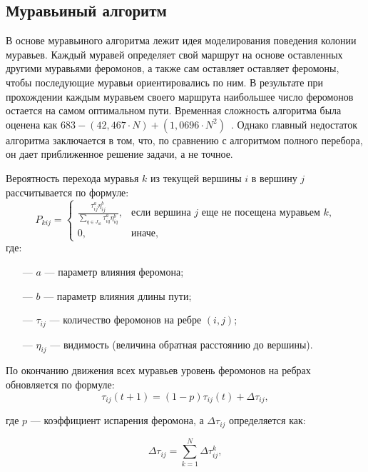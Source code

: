 \subsection{Муравьиный алгоритм}
В основе муравьиного алгоритма лежит идея моделирования поведения колонии муравьев. Каждый муравей определяет свой маршрут на основе оставленных другими муравьями феромонов, а также сам оставляет оставляет феромоны, чтобы последующие муравьи ориентировались по ним. В результате при прохождении каждым муравьем своего маршрута наибольшее число феромонов остается на самом оптимальном пути. Временная сложность алгоритма была оценена как $683 - (42,467 · N) + (1,0696 · N^2)$~\cite{ants}. Однако главный недостаток алгоритма заключается в том, что, по сравнению с алгоритмом полного перебора, он дает приближенное решение задачи, а не точное.

Вероятность перехода муравья $k$ из текущей вершины $i$ в вершину $j$ рассчитывается по формуле:
\begin{equation}
    \label{posib}
    P_{kij} = 
    \begin{cases}
        \frac{\tau_{ij}^a \eta_{ij}^b}{\sum_{q \in J_{ik}} \tau_{iq}^a \eta_{iq}^b}, & \text{если вершина $j$ еще не посещена муравьем $k$,} \\
        0, & \text{иначе,}
    \end{cases}
\end{equation}
где:
\begin{itemize}
    \item[---] $a$ --- параметр влияния феромона;
    \item[---] $b$ --- параметр влияния длины пути;
    \item[---] $\tau_{ij}$ --- количество феромонов на ребре $(i, j)$;
    \item[---] $\eta_{ij}$ --- видимость (величина обратная расстоянию до вершины).
\end{itemize}

По окончанию движения всех муравьев уровень феромонов на ребрах обновляется по формуле:
\begin{equation}
    \label{update_phero_1}
    \tau_{ij}(t+1) = (1-p)\tau_{ij}(t) + \Delta \tau_{ij},
\end{equation}

где $p$ — коэффициент испарения феромона, а $\Delta \tau_{ij}$ определяется как:

\begin{equation}
    \label{update_phero_2}
    \Delta \tau_{ij} = \sum_{k=1}^N \Delta \tau_{ij}^k,
\end{equation}


